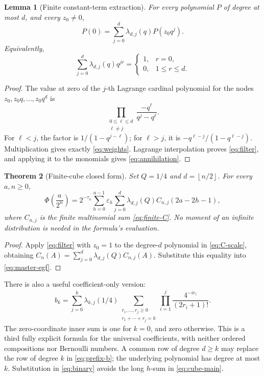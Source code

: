 \documentclass[11pt,a4paper]{article}
\newtheorem{theorem}{Theorem}[section]
\newtheorem{lemma}[theorem]{Lemma}
\theoremstyle{definition}
\theoremstyle{remark}
\newcommand{\eps}{\varepsilon}
\newcommand{\floor}[1]{\left\lfloor #1\right\rfloor}
\begin{document}
\begin{lemma}[Finite constant-term extraction]
For every polynomial \(P\) of degree at most \(d\), and every \(z_0\neq0\),
\begin{equation}
 P(0)=\sum_{j=0}^{d}\lambda_{d,j}(q)P(z_0q^j).
                                                               \label{eq:filter}
\end{equation}
Equivalently,
\begin{equation}
 \sum_{j=0}^{d}\lambda_{d,j}(q)q^{jr}
  =\begin{cases}1,&r=0,\\0,&1\leq r\leq d.\end{cases} \label{eq:annihilation}
\end{equation}
\end{lemma}
\begin{proof}
The value at zero of the \(j\)-th Lagrange cardinal polynomial for the nodes
\(z_0,z_0q,\ldots,z_0q^d\) is
\[
 \prod_{\substack{0\leq\ell\leq d\\\ell\ne j}}
       \frac{-q^\ell}{q^j-q^\ell}.
\]
For \(\ell<j\), the factor is \(1/(1-q^{j-\ell})\); for \(\ell>j\), it is
\(-q^{\ell-j}/(1-q^{\ell-j})\).  Multiplication gives exactly
\eqref{eq:weights}.  Lagrange interpolation proves \eqref{eq:filter}, and applying
it to the monomials gives \eqref{eq:annihilation}.
\end{proof}

\begin{theorem}[Finite-cube closed form]
Set \(Q=1/4\) and \(d=\floor{n/2}\).  For every \(a,n\geq0\),
\begin{equation}
 \boxed{\displaystyle
 \Phi\!\left(\frac a{2^n}\right)
 =2^{-\tau_n}\sum_{h=0}^{a-1}\eps_h
       \sum_{j=0}^{d}\lambda_{d,j}(Q)
                 C_{n,j}(2a-2h-1),}                    \label{eq:cube-main}
\end{equation}
where \(C_{n,j}\) is the finite multinomial sum \eqref{eq:finite-C}.
No moment of an infinite distribution is needed in the formula's evaluation.
\end{theorem}
\begin{proof}
Apply \eqref{eq:filter} with \(z_0=1\) to the degree-\(d\) polynomial in
\eqref{eq:C-scale}, obtaining
\(C_n(A)=\sum_{j=0}^{d}\lambda_{d,j}(Q)C_{n,j}(A)\).
Substitute this equality into \eqref{eq:master-egf}.
\end{proof}

There is also a useful coefficient-only version:
\begin{equation}
 \boxed{\displaystyle
 b_k=\sum_{j=0}^{k}\lambda_{k,j}(1/4)
       \sum_{\substack{r_1,\ldots,r_j\geq0\\r_1+\cdots+r_j=k}}
            \prod_{i=1}^{j}\frac{4^{-ir_i}}{(2r_i+1)!}.} \label{eq:prefix-b}
\end{equation}
The zero-coordinate inner sum is one for \(k=0\), and zero otherwise.
This is a third fully explicit formula for the universal coefficients, with neither
ordered compositions nor Bernoulli numbers.  A common row of degree \(d\geq k\)
may replace the row of degree \(k\) in \eqref{eq:prefix-b}; the underlying
polynomial has degree at most \(k\).  Substitution in \eqref{eq:binary} avoids the
long \(h\)-sum in \eqref{eq:cube-main}.
\end{document}
